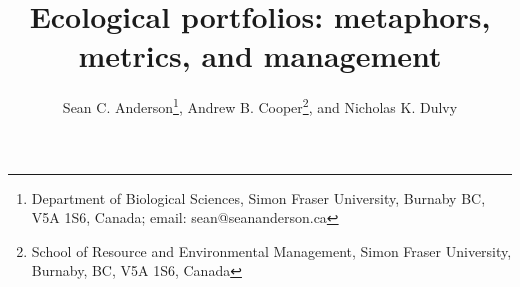 \documentclass[11pt]{article}
\title{Ecological portfolios: metaphors,\\metrics, and management}
\author{Sean C. Anderson\thanks{Department of Biological Sciences, Simon Fraser
    University, Burnaby BC, V5A 1S6, Canada; email: sean@seananderson.ca},
  Andrew B. Cooper\thanks{School of Resource and Environmental Management,
    Simon Fraser University, Burnaby, BC, V5A 1S6, Canada},
  and Nicholas K. Dulvy\footnotemark[1]}
\date{}
\begin{document}

\maketitle

\linenumbers
\modulolinenumbers[3]
\begin{spacing}{1.4}



%
\clearpage

\clearpage

\clearpage


\end{spacing}
\end{document}
